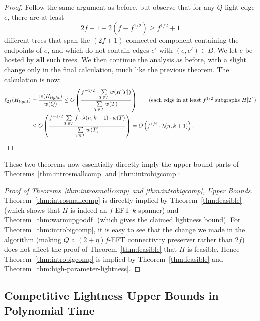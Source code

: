 \begin{proof}
Follow the same argument as before, but observe that for any $Q$-light edge $e$, there are at least 
$$2f+1 - 2(f - f^{1/2}) \ge f^{1/2} +1$$ 
different trees that span the $(2f+1)$-connected component containing the endpoints of $e$, and which do not contain edges $e'$ with $(e, e') \in B$.
We let $e$ be hosted by \textbf{all} such trees.
We then continue the analysis as before, with a slight change only in the final calculation, much like the previous theorem.
The calculation is now:
\begin{align*}
\ell_{2f}(H_{light}) &= \frac{w(H_{light})}{w(Q)} \le  O\left(  \frac{f^{-1/2} \cdot \sum \limits_{T \in \tee} w(H[T])}{\sum \limits_{T \in \tee} w(T)} \right) \tag{each edge in at least $f^{1/2}$ subgraphs $H[T]$}\\
&\le  O\left( \frac{f^{-1/2} \sum \limits_{T \in \tee} f \cdot \lambda(n, k+1) \cdot w(T)}{\sum \limits_{T \in \tee} w(T)} \right) = O\left(f^{1/2} \cdot \lambda(n, k+1)\right). \tag*{\qedhere}
\end{align*}
\end{proof}

These two theorems now essentially directly imply the upper bound parts of Theorems~\ref{thm:introsmallcomp} and \ref{thm:introbigcomp}:

\begin{proof}[Proof of Theorems~\ref{thm:introsmallcomp} and \ref{thm:introbigcomp}, Upper Bounds]
    Theorem~\ref{thm:introsmallcomp} is directly implied by Theorem~\ref{thm:feasible} (which shows that $H$ is indeed an $f$-EFT $k$-spanner) and Theorem~\ref{thm:warmupgoodf} (which gives the claimed lightness bound).  For Theorem~\ref{thm:introbigcomp}, it is easy to see that the change we made in the algorithm (making $Q$ a $(2+\eta)f$-EFT connectivity preserver rather than $2f$) does not affect the proof of Theorem~\ref{thm:feasible} that $H$ is feasible.  Hence Theorem~\ref{thm:introbigcomp} is implied by Theorem~\ref{thm:feasible} and Theorem~\ref{thm:high-parameter-lightness}.
\end{proof}

\ifshort
\else
\subsection{Competitive Lightness Upper Bounds in Polynomial Time} \label{sec:polytime}

